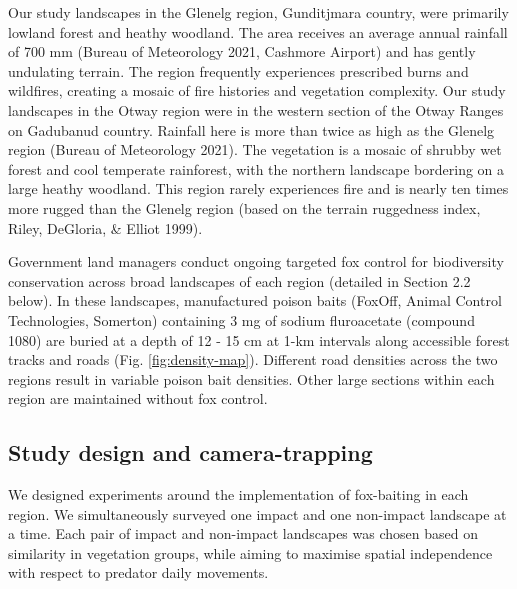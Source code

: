 \documentclass[11pt,a4paper,titlepage,twoside,openright]{style/unimelbthesis}
\begin{document}
\begin{mainmatter}
Our study landscapes in the Glenelg region, Gunditjmara country, were primarily lowland forest and heathy woodland. The area receives an average annual rainfall of 700 mm (Bureau of Meteorology 2021, Cashmore Airport) and has gently undulating terrain. The region frequently experiences prescribed burns and wildfires, creating a mosaic of fire histories and vegetation complexity. Our study landscapes in the Otway region were in the western section of the Otway Ranges on Gadubanud country. Rainfall here is more than twice as high as the Glenelg region (Bureau of Meteorology 2021). The vegetation is a mosaic of shrubby wet forest and cool temperate rainforest, with the northern landscape bordering on a large heathy woodland. This region rarely experiences fire and is nearly ten times more rugged than the Glenelg region (based on the terrain ruggedness index, Riley, DeGloria, \& Elliot 1999).

Government land managers conduct ongoing targeted fox control for biodiversity conservation across broad landscapes of each region (detailed in Section 2.2 below). In these landscapes, manufactured poison baits (FoxOff, Animal Control Technologies, Somerton) containing 3 mg of sodium fluroacetate (compound 1080) are buried at a depth of 12 - 15 cm at 1-km intervals along accessible forest tracks and roads (Fig. \ref{fig:density-map}). Different road densities across the two regions result in variable poison bait densities. Other large sections within each region are maintained without fox control.

\hypertarget{study-design-and-camera-trapping}{%
\subsection{Study design and camera-trapping}\label{study-design-and-camera-trapping}}

We designed experiments around the implementation of fox-baiting in each region. We simultaneously surveyed one impact and one non-impact landscape at a time. Each pair of impact and non-impact landscapes was chosen based on similarity in vegetation groups, while aiming to maximise spatial independence with respect to predator daily movements.


\end{mainmatter}
\end{document}
